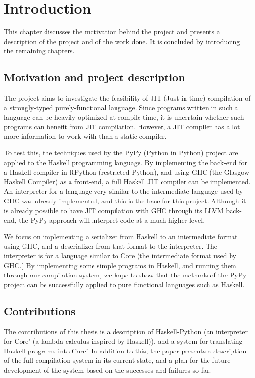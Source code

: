 
\chapter{Introduction}

This chapter discusses the motivation behind the project and 
presents a description of the project and of the work done. It 
is concluded by introducing the remaining chapters.

\section{Motivation and project description}

The project aims to investigate the feasibility of JIT (Just-in-time) 
compilation of a strongly-typed purely-functional language. Since
programs written in such a language can be heavily optimized at 
compile time, it is uncertain whether such programs can benefit from
JIT compilation. However, a JIT compiler has a lot more information to
work with than a static compiler. 

To test this, the techniques 
used by the PyPy (Python in Python) project are applied to the Haskell 
programming language. By implementing the back-end for a Haskell compiler 
in RPython (restricted Python), and using GHC (the Glasgow Haskell Compiler) 
as a front-end, a full Haskell JIT compiler can be implemented. An 
interpreter for a language very similar to the intermediate language used
by GHC was already implemented, and this is the base for this project.
Although it is already possible to have JIT compilation with GHC through
its LLVM back-end, the PyPy approach will interpret code at a much higher level.

We focus on implementing a serializer from Haskell to an intermediate
format using GHC, and a deserializer from that format to the interpreter. The 
interpreter is for a language similar to Core (the intermediate format used by GHC.)
By implementing some simple programs in Haskell, and running them through our 
compilation system, 
we hope to show that the methods of the PyPy project can be successfully applied 
to pure functional languages such as Haskell.

\section{Contributions}
The contributions of this thesis is a description of Haskell-Python (an
interpreter for Core' (a lambda-calculus inspired by Haskell)), and a system for
translating Haskell programs into Core'. In addition to this, the paper 
presents a description of the full compilation system in its current state,
and a plan for the future development of the system based on the 
successes and failures so far.

